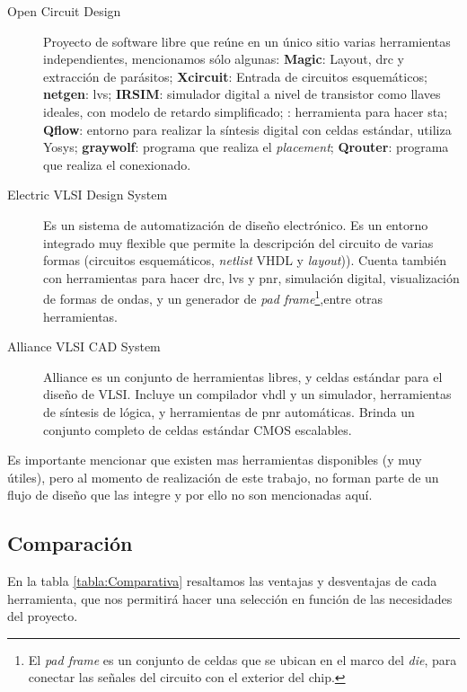 \begin{description}
\item[Open Circuit Design] Proyecto de software libre que reúne en un único sitio varias herramientas independientes, mencionamos sólo algunas:  \textbf{Magic}: Layout, \gls{drc} y extracción de parásitos; \textbf{Xcircuit}: Entrada de circuitos esquemáticos; \textbf{netgen}: \gls{lvs}; \textbf{IRSIM}: simulador digital a nivel de transistor como llaves ideales, con modelo de retardo simplificado; : herramienta para hacer \gls{sta}; \textbf{Qflow}: entorno para realizar la síntesis digital con celdas estándar, utiliza Yosys\cite{Yosys}; \textbf{graywolf}: programa que realiza el \emph{placement}; \textbf{Qrouter}: programa que realiza el conexionado.

\item[Electric VLSI Design System\cite{Electric}] Es un sistema de automatización de diseño electrónico. Es un entorno integrado muy flexible que permite la descripción del circuito de varias formas (circuitos esquemáticos, \emph{netlist} VHDL y \emph{layout})). Cuenta también con herramientas para hacer \gls{drc}, \gls{lvs} y \gls{pnr}, simulación digital, visualización de formas de ondas, y un generador de \emph{pad frame}\footnote{El \emph{pad frame} es un conjunto de celdas que se ubican en el marco del \emph{die}, para conectar las señales del circuito con el exterior del chip.},entre otras herramientas.

\item[Alliance VLSI CAD System\cite{Alliance}] Alliance es un conjunto de herramientas libres, y celdas estándar para el diseño de VLSI. Incluye un compilador vhdl y un simulador, herramientas de síntesis de lógica, y herramientas de \gls{pnr} automáticas. Brinda un conjunto completo de celdas estándar CMOS escalables.

\end{description}

Es importante mencionar que existen mas herramientas disponibles (y muy útiles), pero al momento de realización de este trabajo, no forman parte de un flujo de diseño que las integre y por ello no son mencionadas aquí. 

\subsection{Comparación}
En la tabla \ref{tabla:Comparativa} resaltamos las ventajas y desventajas de cada herramienta, que nos permitirá hacer una selección en función de las necesidades del proyecto.


